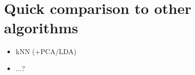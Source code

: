 \documentclass{netsec2012}
\begin{document}
\section{Quick comparison to other algorithms}

\begin{itemize}
\item kNN (+PCA/LDA)
\item ...?
\end{itemize}


\cite{albanese12mlpy}



\end{document}
